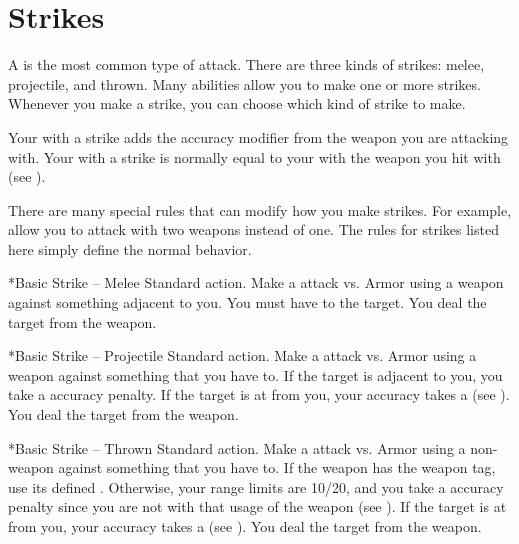 \section{Strikes}\label{Strikes}
  A  is the most common type of attack.
  There are three kinds of strikes: melee, projectile, and thrown.
  Many abilities allow you to make one or more strikes.
  Whenever you make a strike, you can choose which kind of strike to make.

  Your  with a strike adds the accuracy modifier from the weapon you are attacking with.
  Your  with a strike is normally equal to your  with the weapon you hit with (see ).

  There are many special rules that can modify how you make strikes.
  For example,  allow you to attack with two weapons instead of one.
  The rules for strikes listed here simply define the normal behavior.

  \begin{activeability}*{Basic Strike -- Melee}
    \abilityusagetime Standard action.
    \rankline
    Make a  attack vs. Armor using a weapon against something adjacent to you.
    You must have  to the target.
    \hit You deal the target  from the weapon.
  \end{activeability}

  \begin{activeability}*{Basic Strike -- Projectile}
    \abilityusagetime Standard action.
    \rankline
    Make a  attack vs. Armor using a  weapon against something that you have  to.
    If the target is adjacent to you, you take a  accuracy penalty.
    If the target is at  from you, your accuracy takes a   (see ).
    \hit You deal the target  from the weapon.
  \end{activeability}

  \begin{activeability}*{Basic Strike -- Thrown}
    \abilityusagetime Standard action.
    \rankline
    Make a  attack vs. Armor using a non- weapon against something that you have  to.
    If the weapon has the  weapon tag, use its defined .
    Otherwise, your range limits are 10/20, and you take a  accuracy penalty since you are not  with that usage of the weapon (see ).
    If the target is at  from you, your accuracy takes a   (see ).
    \hit You deal the target  from the weapon.
  \end{activeability}

